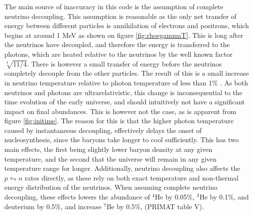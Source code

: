 The main source of inaccuracy in this code is the assumption of complete neutrino decoupling. This assumption is reasonable as the only net transfer of energy between different particles is annihilation of electrons and positrons, which begins at around 1 MeV as shown on figure \ref{fig:rhoegammaT}. This is long after the neutrinos have decoupled, and therefore the energy is transferred to the photons, which are heated relative to the neutrinos by the well known factor $\sqrt[3]{11/4}$. There is however a small transfer of energy before the neutrinos completely decouple from the other particles. The result of this is a small increase in neutrino temperature relative to photon temperature of less than 1\% \cite{Hannestad:1995rs}. As both neutrinos and photons are ultrarelativistic, this change is inconsequential to the time evolution of the early universe, and should intuitively not have a significant impact on final abundances. This is however not the case, as is apparent from figure \ref{fig:initime}. The reason for this is that the higher photon temperature caused by instantaneous decoupling, effectively delays the onset of nucleosynthesis, since the baryons take longer to cool sufficiently. This has two main effects, the first being slightly lower baryon density at any given temperature, and the second that the universe will remain in any given temperature range for longer. Additionally, neutrino decoupling also affects the $p\leftrightharpoons n$ rates directly, as these rely on both exact temperature and non-thermal energy distribution of the neutrinos. When assuming complete neutrino decoupling, these effects lowers the abundance of ${}^4$He by 0.05\%, ${}^3$He by 0.1\%, and deuterium by 0.5\%, and increase ${}^7$Be by 0.5\%, (PRIMAT table V\cite{PRIMAT}). 


